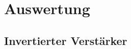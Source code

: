 \section{Auswertung}
\label{sec:Auswertung}

\subsection{Invertierter Verstärker}
\label{sec:Invertierter_Verstärker}
